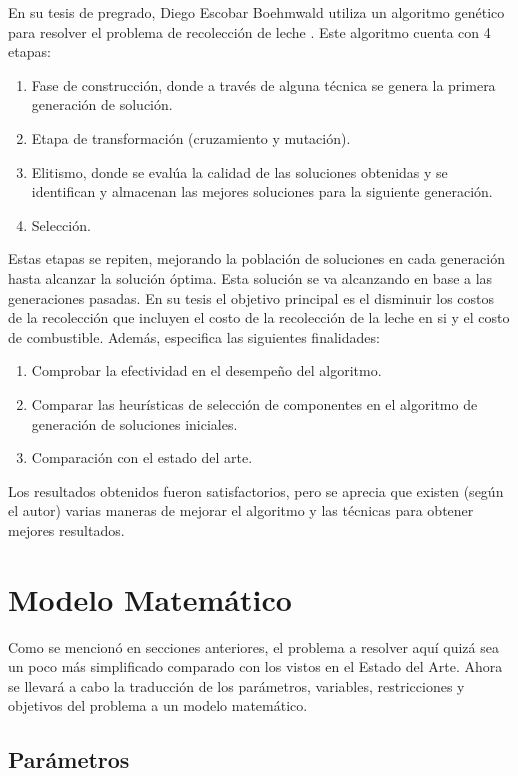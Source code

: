 \documentclass[letter, 10pt]{article}
\begin{document}
En su tesis de pregrado, Diego Escobar Boehmwald utiliza un algoritmo gen\'etico para resolver el problema de recolecci\'on de leche \cite{genetico}. Este algoritmo cuenta con 4 etapas:
\begin{enumerate}
    \item Fase de construcci\'on, donde a trav\'es de alguna t\'ecnica se genera la primera generaci\'on de soluci\'on.
    \item Etapa de transformaci\'on (cruzamiento y mutaci\'on).
    \item Elitismo, donde se eval\'ua la calidad de las soluciones obtenidas y se identifican y almacenan las mejores soluciones para la siguiente generaci\'on.
    \item Selecci\'on.
\end{enumerate}

Estas etapas se repiten, mejorando la poblaci\'on de soluciones en cada generaci\'on hasta alcanzar la soluci\'on \'optima. Esta soluci\'on se va alcanzando en base a las generaciones pasadas. En su tesis el objetivo principal es el disminuir los costos de la recolecci\'on que incluyen el costo de la recolecci\'on de la leche en si y el costo de combustible. Adem\'as, especifica las siguientes finalidades:
\begin{enumerate}
    \item Comprobar la efectividad en el desempe\~{n}o del algoritmo.
    \item Comparar las heur\'isticas de selecci\'on de componentes en el algoritmo de generaci\'on de soluciones iniciales.
    \item Comparaci\'on con el estado del arte.
\end{enumerate}

Los resultados obtenidos fueron satisfactorios, pero se aprecia que existen (seg\'un el autor) varias maneras de mejorar el algoritmo y las t\'ecnicas para obtener mejores resultados.

\section{Modelo Matem\'atico}

Como se mencion\'o en secciones anteriores, el problema a resolver aqu\'i quiz\'a sea un poco m\'as simplificado comparado con los vistos en el Estado del Arte. Ahora se llevar\'a a cabo la traducci\'on de los par\'ametros, variables, restricciones y objetivos del problema a un modelo matem\'atico.

\subsection{Par\'ametros}
\end{document}
